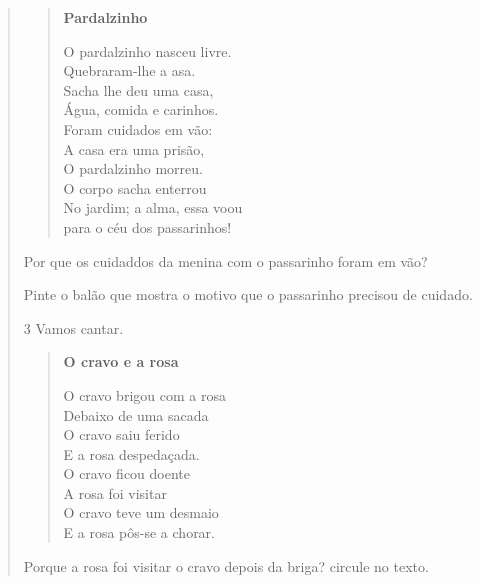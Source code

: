 \begin{verse}
\begin{verse}
\textbf{Pardalzinho}

O pardalzinho nasceu livre.\\
Quebraram-lhe a asa.\\
Sacha lhe deu uma casa,\\
Água, comida e carinhos.\\
Foram cuidados em vão:\\
A casa era uma prisão,\\
O pardalzinho morreu.\\
O corpo sacha enterrou\\
No jardim; a alma, essa voou\\
para o céu dos passarinhos!
\end{verse}


\begin{escolha}
\item Por que os cuidaddos da menina com o passarinho foram em vão?


\item Pinte o balão que mostra o motivo que o passarinho precisou de cuidado.
\end{escolha}

\num{3} Vamos cantar.


\begin{verse}
\textbf{O cravo e a rosa}

O cravo brigou com a rosa\\
Debaixo de uma sacada\\
O cravo saiu ferido\\
E a rosa despedaçada.\\
O cravo ficou doente\\
A rosa foi visitar\\
O cravo teve um desmaio\\
E a rosa pôs-se a chorar.
\end{verse}


\begin{escolha}
\item Porque a rosa foi visitar o cravo depois da briga? circule no texto.


\end{escolha}
\end{verse}
